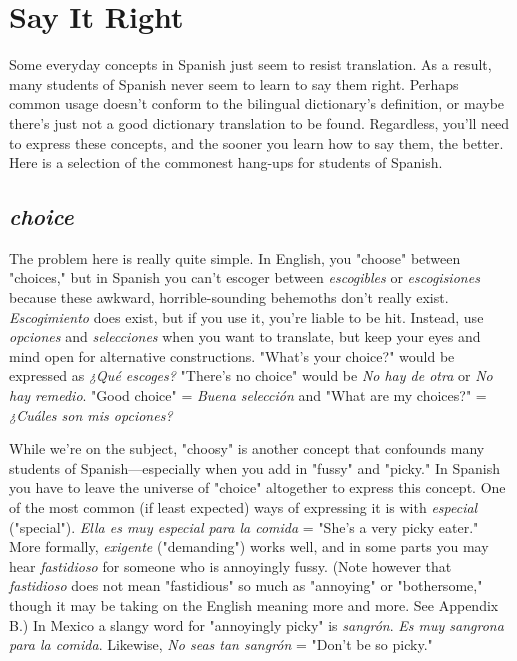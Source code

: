 \chapter{Say It Right}

Some everyday concepts in Spanish just seem to resist translation. As a result, many students of Spanish never seem to learn to say
them right. Perhaps common usage doesn't conform to the bilingual
dictionary's definition, or maybe there's just not a good dictionary
translation to be found. Regardless, you'll need to express these concepts, and the sooner you learn how to say them, the better. Here is a
selection of the commonest hang-ups for students of Spanish.

\section{\emph{choice}}

The problem here is really quite simple. In English, you
"choose" between "choices," but in Spanish you can't escoger between
\emph{escogibles} or \emph{escogisiones} because these awkward, horrible-sounding
behemoths don't really exist. \emph{Escogimiento} does exist, but if you use
it, you're liable to be hit. Instead, use \emph{opciones} and \emph{selecciones} when
you want to translate, but keep your eyes and mind open for alternative constructions. "What's your choice?" would be expressed as \emph{¿Qué
escoges?} "There's no choice" would be \emph{No hay de otra} or \emph{No hay remedio}. "Good choice" = \emph{Buena selección} and "What are my choices?"
= \emph{¿Cuáles son mis opciones?}

While we're on the subject, "choosy" is another concept that
confounds many students of Spanish---especially when you add in
"fussy" and "picky." In Spanish you have to leave the universe of
"choice" altogether to express this concept. One of the most common
(if least expected) ways of expressing it is with \emph{especial} ("special").
\emph{Ella es muy especial para la comida} = "She's a very picky eater."
More formally, \emph{exigente} ("demanding") works well, and in some parts
you may hear \emph{fastidioso} for someone who is annoyingly fussy. (Note
however that \emph{fastidioso} does not mean "fastidious" so much as "annoying" or "bothersome," though it may be taking on the English
meaning more and more. See Appendix B.) In Mexico a slangy word
for "annoyingly picky" is \emph{sangrón}. \emph{Es muy sangrona para la comida}.
Likewise, \emph{No seas tan sangrón} = "Don't be so picky."

